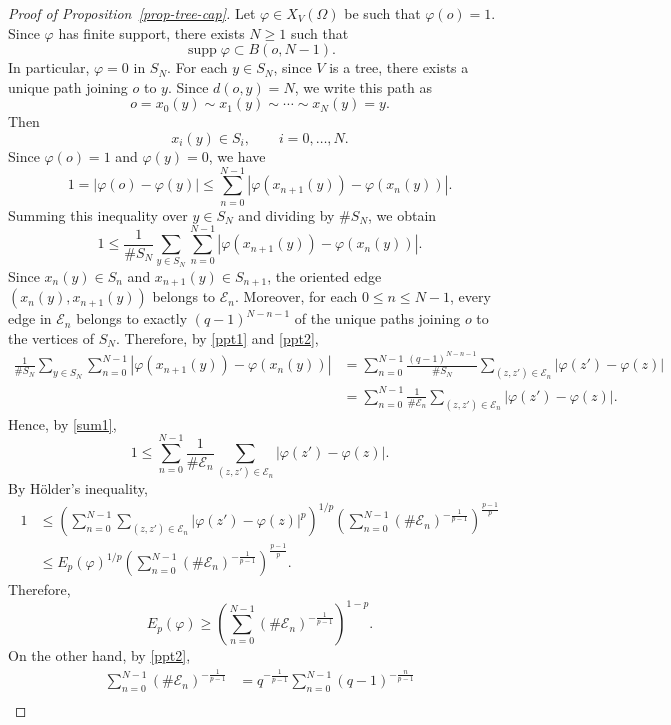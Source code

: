 \documentclass[twoside,12pt,letter]{article}
\theoremstyle{plain}
\theoremstyle{definition}
\theoremstyle{remark}
\numberwithin{equation}{section}
\begin{document}
\begin{proof}[Proof of Proposition~\ref{prop-tree-cap}]
Let \(\varphi\in X_V(\Omega)\) be such that \(\varphi(o)=1\). Since
\(\varphi\) has finite support, there exists \(N\ge 1\) such that
\[
\operatorname{supp}\varphi\subset B(o,N-1).
\]
In particular, \(\varphi=0\) in \(S_N\). For each \(y\in S_N\), since \(V\) is
a tree, there exists a unique path joining \(o\) to \(y\). Since \(d(o,y)=N\),
we write this path as
\[
o=x_0(y)\sim x_1(y)\sim\cdots\sim x_N(y)=y.
\]
Then
\[
x_i(y)\in S_i,\qquad i=0,\ldots,N.
\]
Since \(\varphi(o)=1\) and \(\varphi(y)=0\), we have
\[
1
=
|\varphi(o)-\varphi(y)|
\le
\sum_{n=0}^{N-1}
|\varphi(x_{n+1}(y))-\varphi(x_n(y))|.
\]
Summing this inequality over \(y\in S_N\) and dividing by \(\#S_N\), we obtain
\begin{equation}\label{sum1}
1
\le
\frac{1}{\#S_N}
\sum_{y\in S_N}
\sum_{n=0}^{N-1}
|\varphi(x_{n+1}(y))-\varphi(x_n(y))|.
\end{equation}
Since \(x_n(y)\in S_n\) and \(x_{n+1}(y)\in S_{n+1}\), the oriented edge
\((x_n(y),x_{n+1}(y))\) belongs to \(\mathcal{E}_n\). Moreover, for each
\(0\le n\le N-1\), every edge in \(\mathcal{E}_n\) belongs to exactly
\((q-1)^{N-n-1}\) of the unique paths joining \(o\) to the vertices of
\(S_N\). Therefore, by \eqref{ppt1} and \eqref{ppt2},
\[
\begin{aligned}
\frac{1}{\#S_N}
\sum_{y\in S_N}
\sum_{n=0}^{N-1}
|\varphi(x_{n+1}(y))-\varphi(x_n(y))|
&=
\sum_{n=0}^{N-1}
\frac{(q-1)^{N-n-1}}{\#S_N}
\sum_{(z,z')\in\mathcal{E}_n}
|\varphi(z')-\varphi(z)|  \\
&=
\sum_{n=0}^{N-1}
\frac{1}{\#\mathcal{E}_n}
\sum_{(z,z')\in\mathcal{E}_n}
|\varphi(z')-\varphi(z)|.
\end{aligned}
\]
Hence, by \eqref{sum1},
\[
1
\le
\sum_{n=0}^{N-1}
\frac{1}{\#\mathcal{E}_n}
\sum_{(z,z')\in\mathcal{E}_n}
|\varphi(z')-\varphi(z)|.
\]
By H\"older's inequality,
\[
\begin{aligned}
1
&\le
\left(
\sum_{n=0}^{N-1}
\sum_{(z,z')\in\mathcal{E}_n}
|\varphi(z')-\varphi(z)|^p
\right)^{1/p}
\left(
\sum_{n=0}^{N-1}(\#\mathcal{E}_n)^{-\frac{1}{p-1}}
\right)^{\frac{p-1}{p}}  \\
&\le
E_p(\varphi)^{1/p}
\left(
\sum_{n=0}^{N-1}(\#\mathcal{E}_n)^{-\frac{1}{p-1}}
\right)^{\frac{p-1}{p}}.
\end{aligned}
\]
Therefore,
\[
E_p(\varphi)
\ge
\left(
\sum_{n=0}^{N-1}(\#\mathcal{E}_n)^{-\frac{1}{p-1}}
\right)^{1-p}.
\]
On the other hand, by \eqref{ppt2},
\[
\begin{aligned}
\sum_{n=0}^{N-1}(\#\mathcal{E}_n)^{-\frac{1}{p-1}}
&=
q^{-\frac{1}{p-1}}
\sum_{n=0}^{N-1}(q-1)^{-\frac{n}{p-1}}  \\

\end{aligned}\]
\end{proof}
\end{document}
